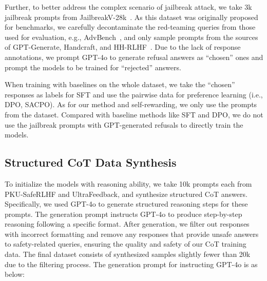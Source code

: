 Further, to better address the complex scenario of jailbreak attack, we take 3k jailbreak prompts from JailbreakV-28k~\cite{luo2024jailbreakv}. As this dataset was originally proposed for benchmarks, we carefully decontaminate the red-teaming queries from those used for evaluation, e.g., AdvBench~\cite{zou2023universal}, and only sample prompts from the sources of GPT-Generate, Handcraft, and HH-RLHF~\cite{ganguli2022red}. Due to the lack of response annotations, we prompt GPT-4o to generate refusal answers as ``chosen'' ones and prompt the models to be trained for ``rejected'' answers.


When training with baselines on the whole dataset, we take the ``chosen'' responses as labels for SFT and use the pairwise data for preference learning (i.e., DPO, SACPO). As for our method and self-rewarding, we only use the prompts from the dataset. Compared with baseline methods like SFT and DPO, we do not use the jailbreak prompts with GPT-generated refusals to directly train the models.



\subsection{Structured CoT Data Synthesis}
\label{sec:appendix_cot}
To initialize the models with reasoning ability, we take 10k prompts each from PKU-SafeRLHF and UltraFeedback, and synthesize structured CoT answers. Specifically, we used GPT-4o to generate structured reasoning steps for these prompts. The generation prompt instructs GPT-4o to produce step-by-step reasoning following a specific format. After generation, we filter out responses with incorrect formatting and remove any responses that provide unsafe answers to safety-related queries, ensuring the quality and safety of our CoT training data. The final dataset consists of synthesized samples slightly fewer than 20k due to the filtering process. The generation prompt for instructing GPT-4o is as below:

